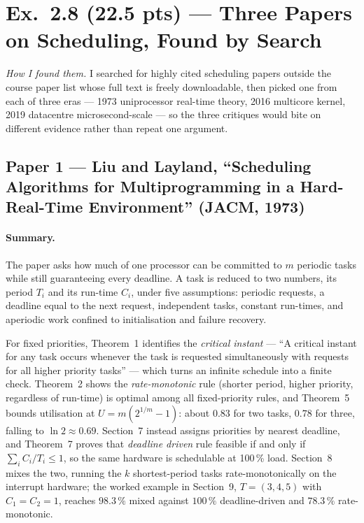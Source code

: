 \section*{Ex.~2.8 (22.5 pts) --- Three Papers on Scheduling, Found by Search}

\emph{How I found them.} I searched for highly cited scheduling papers outside the
course paper list whose full text is freely downloadable, then picked one from each of
three eras --- 1973 uniprocessor real-time theory, 2016 multicore kernel, 2019
datacentre microsecond-scale --- so the three critiques would bite on different
evidence rather than repeat one argument.

\subsection*{Paper 1 --- Liu and Layland, ``Scheduling Algorithms for
Multiprogramming in a Hard-Real-Time Environment'' (JACM, 1973)}

\paragraph{Summary.}
The paper asks how much of one processor can be committed to $m$ periodic tasks while
still guaranteeing every deadline. A task is reduced to two numbers, its period $T_i$
and its run-time $C_i$, under five assumptions: periodic requests, a deadline equal to
the next request, independent tasks, constant run-times, and aperiodic work confined to
initialisation and failure recovery.

For fixed priorities, Theorem~1 identifies the \emph{critical instant} --- ``A critical
instant for any task occurs whenever the task is requested simultaneously with requests
for all higher priority tasks'' --- which turns an infinite schedule into a finite
check. Theorem~2 shows the \emph{rate-monotonic} rule (shorter period, higher priority,
regardless of run-time) is optimal among all fixed-priority rules, and Theorem~5 bounds
utilisation at $U = m\left(2^{1/m}-1\right)$: about $0.83$ for two tasks, $0.78$ for
three, falling to $\ln 2 \approx 0.69$. Section~7 instead assigns priorities by nearest
deadline, and Theorem~7 proves that \emph{deadline driven} rule feasible if and only if
$\sum_i C_i/T_i \le 1$, so the same hardware is schedulable at 100\,\% load. Section~8
mixes the two, running the $k$ shortest-period tasks rate-monotonically on the
interrupt hardware; the worked example in Section~9, $T = (3,4,5)$ with $C_1 = C_2 = 1$,
reaches $98.3\,\%$ mixed against $100\,\%$ deadline-driven and $78.3\,\%$
rate-monotonic.

